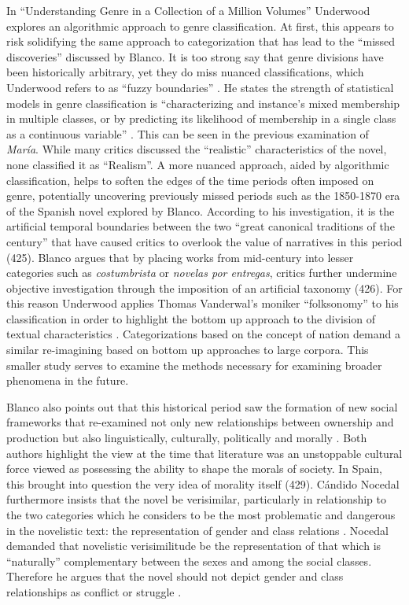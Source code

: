 \documentclass[12pt]{report}
\begin{document}
In \enquote{Understanding Genre in a Collection of a Million Volumes} Underwood explores an algorithmic approach to genre classification. 
At first, this appears to risk solidifying the same approach to categorization that has lead to the \enquote{missed discoveries} discussed by Blanco.
It is too strong say that genre divisions have been historically arbitrary, yet they do miss nuanced classifications, which Underwood refers to as \enquote{fuzzy boundaries} \cite[9]{Underwood2014}.
He states the strength of statistical models in genre classification is \enquote{characterizing and instance's mixed membership in multiple classes, or by predicting its likelihood of membership in a single class as a continuous variable} \cite[9]{Underwood2014}.
This can be seen in the previous examination of \textit{María}.
While many critics discussed the \enquote{realistic} characteristics of the novel, none classified it as \enquote{Realism}.
A more nuanced approach, aided by algorithmic classification, helps to soften the edges of the time periods often imposed on genre, potentially uncovering previously missed periods such as the 1850-1870 era of the Spanish novel explored by Blanco.
According to his investigation, it is the artificial temporal boundaries between the two \enquote{great canonical traditions of the century} that have caused critics to overlook the value of narratives in this period (425)\nocite{Blanco2000}.
Blanco argues that by placing works from mid-century into lesser categories such as \textit{costumbrista} or \textit{novelas por entregas}, critics further undermine objective investigation through the imposition of an artificial taxonomy (426)\nocite{Blanco2000}.
For this reason Underwood applies Thomas Vanderwal's moniker \enquote{folksonomy} to his classification in order to highlight the bottom up approach to the division of textual characteristics \cite{Underwood2014, Vanderwal2007}.
Categorizations based on the concept of nation demand a similar re-imagining based on bottom up approaches to large corpora.
This smaller study serves to examine the methods necessary for examining broader phenomena in the future.


Blanco also points out that this historical period saw the formation of new social frameworks that re-examined not only new relationships between ownership and production but also linguistically, culturally, politically and morally \autocite[429]{Blanco2000}.
Both authors highlight the view at the time that literature was an unstoppable cultural force viewed as possessing the ability to shape the morals of society. 
In Spain, this brought into question the very idea of morality itself (429)\autocite{Blanco2000}.
Cándido Nocedal furthermore insists that the novel be verisimilar, particularly in relationship to the two categories which he considers to be the most
problematic and dangerous in the novelistic text: the representation of gender and class relations \cite[430]{Blanco2000}.
Nocedal demanded that novelistic verisimilitude be the representation of that which is “naturally” complementary between the sexes and among the social classes. 
Therefore he argues that the novel should not depict gender and class relationships as conflict or struggle \cite[430]{Blanco2000}.
\end{document}
